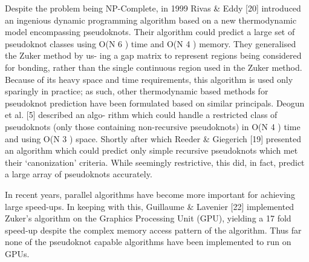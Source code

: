 \documentclass{cshonours}
\begin{document}
Despite the problem being NP-Complete, in 1999 Rivas \& Eddy [20] introduced an ingenious dynamic
programming algorithm based on a new thermodynamic model encompassing pseudoknots. Their algorithm could predict a large set of pseudoknot classes using
O(N 6 ) time and O(N 4 ) memory. They generalised the Zuker method by us-
ing a gap matrix to represent regions being considered for bonding, rather than
the single continuous region used in the Zuker method. Because of its heavy
space and time requirements, this algorithm is used only sparingly in practice;
as such, other thermodynamic based methods for pseudoknot prediction have
been formulated based on similar principals. Deogun et al. [5] described an algo-
rithm which could handle a restricted class of pseudoknots (only those containing
non-recursive pseudoknots) in O(N 4 ) time and using O(N 3 ) space. Shortly after which Reeder \& Giegerich [19] presented an algorithm which could predict
only simple recursive pseudoknots which met their `canonization' criteria. While
seemingly restrictive, this did, in fact, predict a large array of pseudoknots accurately. 

In recent years, parallel algorithms have become more important for
achieving large speed-ups. In keeping with this, Guillaume \& Lavenier [22] implemented Zuker’s algorithm on the Graphics Processing Unit (GPU), yielding
a 17 fold speed-up despite the complex memory access pattern of the algorithm.
Thus far none of the pseudoknot capable algorithms have been implemented to
run on GPUs.
\end{document}
